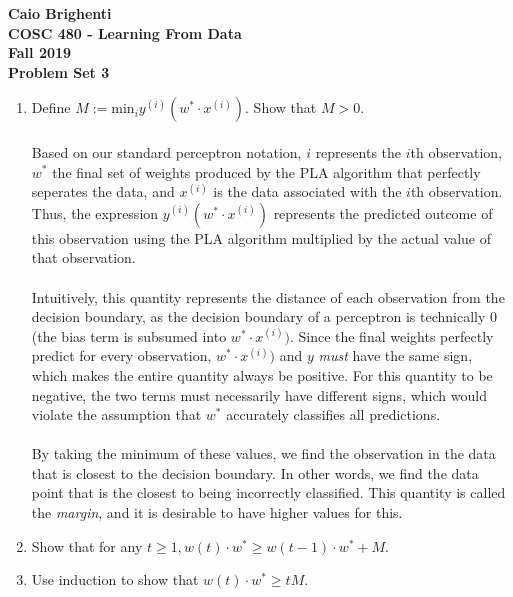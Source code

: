 \documentclass{article}
\begin{document}
\noindent \textbf{Caio Brighenti }\\
\noindent \textbf{COSC 480 - Learning From Data}\\%
\noindent \textbf{Fall 2019}\\%
\noindent \textbf{Problem Set 3}\vspace{1em}\\
\begin{enumerate}
	\item Define $M := \text{min}_i y^{(i)}(w^* \cdot x^{(i)})$. Show that $M > 0$.
	\\\\ Based on our standard perceptron notation, $i$ represents the $i$th observation, $w^*$ the final set of weights produced by the PLA algorithm that perfectly seperates the data, and $x^{(i)}$ is the data associated with the $i$th observation. Thus, the expression $y^{(i)}(w^* \cdot x^{(i)})$ represents the predicted outcome of this observation using the PLA algorithm multiplied by the actual value of that observation.
	\\\\ Intuitively, this quantity represents the distance of each observation from the decision boundary, as the decision boundary of a perceptron is technically 0 (the bias term is subsumed into $w^* \cdot x^{(i)})$. Since the final weights perfectly predict for every observation, $w^* \cdot x^{(i)})$ and $y$ \emph{must} have the same sign, which makes the entire quantity always be positive. For this quantity to be negative, the two terms must necessarily have different signs, which would violate the assumption that $w^*$ accurately classifies all predictions. 
	\\\\ By taking the minimum of these values, we find the observation in the data that is closest to the decision boundary. In other words, we find the data point that is the closest to being incorrectly classified. This quantity is called the \emph{margin}, and it is desirable to have higher values for this.
	\item Show that for any $ t \geq 1, w(t) \cdot w^* \geq w(t-1) \cdot w^* + M$.
	\item Use induction to show that $w(t) \cdot w^* \geq tM$.
\end{enumerate}
	
\end{document}
